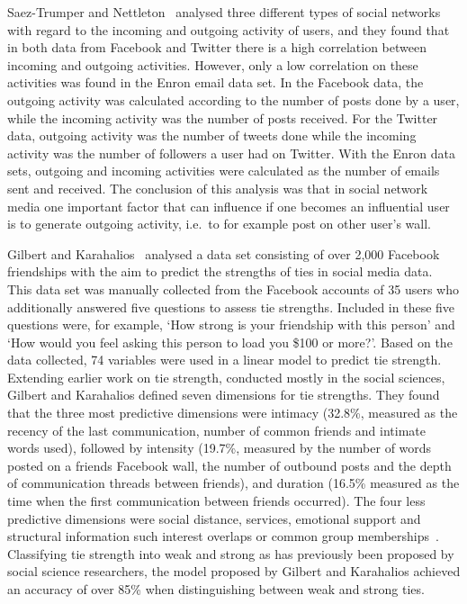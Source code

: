 \documentclass[letterpaper]{article}
\begin{document}
Saez-Trumper and Nettleton~\cite{saez2011high} analysed three
different types of social networks with regard to the incoming and
outgoing activity of users, and they found that in both data from
Facebook and Twitter there is a high correlation between incoming and
outgoing activities. However, only a low correlation on these
activities was found in the Enron email data set. In the Facebook
data, the outgoing activity was calculated according to the number of
posts done by a user, while the incoming activity was the number of
posts received. For the Twitter data, outgoing activity was the number
of tweets done while the incoming activity was the number of followers
a user had on Twitter. With the Enron data sets, outgoing and incoming
activities were calculated as the number of emails sent and received.
The conclusion of this analysis was that in social network media one
important factor that can influence if one becomes an influential user
is to generate outgoing activity, i.e.\ to for example post on other
user's wall.




Gilbert and Karahalios~\cite{gilbert2009predicting} analysed a data
set consisting of over 2,000 Facebook friendships with the aim to
predict the strengths of ties in social media data. This data set was
manually collected from the Facebook accounts of 35 users who
additionally answered five questions to assess tie strengths. Included
in these five questions were, for example, `How strong is your
friendship with this person' and `How would you feel asking this person
to load you \$100 or more?'. Based on the data collected, 74 variables
were used in a linear model to predict tie strength. Extending earlier
work on tie strength, conducted mostly in the social sciences, Gilbert
and Karahalios defined seven dimensions for tie strengths. They found
that the three most predictive dimensions were intimacy (32.8\%,
measured as the recency of the last communication, number of common
friends and intimate words used), followed by intensity (19.7\%,
measured by the number of words posted on a friends Facebook wall, the
number of outbound posts and the depth of communication threads
between friends), and duration (16.5\% measured as the time when the
first communication between friends occurred). The four less predictive
dimensions were social distance, services, emotional support and
structural information such interest overlaps or common group
memberships~\cite{gilbert2009predicting}. Classifying tie strength
into weak and strong as has previously been proposed by social science
researchers, the model proposed by Gilbert and Karahalios achieved an
accuracy of over 85\% when distinguishing between weak and strong ties.
\end{document}

